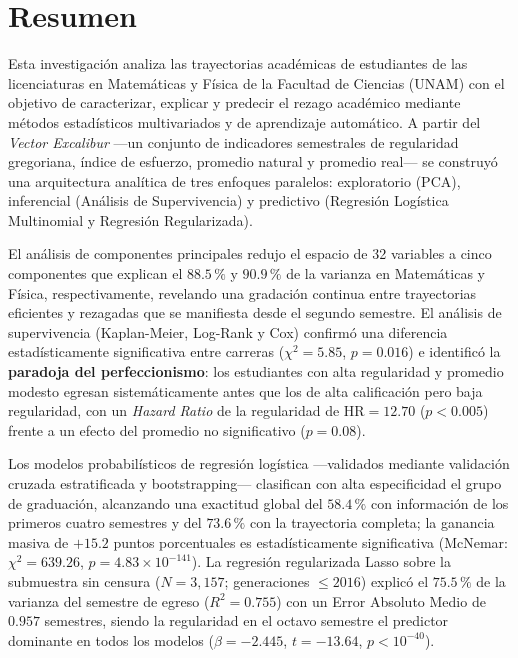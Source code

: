 \chapter*{Resumen}

Esta investigación analiza las trayectorias académicas de estudiantes de las licenciaturas en
Matemáticas y Física de la Facultad de Ciencias (UNAM) con el objetivo de caracterizar,
explicar y predecir el rezago académico mediante métodos estadísticos multivariados y de
aprendizaje automático. A partir del \emph{Vector Excalibur} —un conjunto de indicadores
semestrales de regularidad gregoriana, índice de esfuerzo, promedio natural y promedio
real— se construyó una arquitectura analítica de tres enfoques paralelos: exploratorio
(PCA), inferencial (Análisis de Supervivencia) y predictivo (Regresión Logística Multinomial y Regresión
Regularizada).

El análisis de componentes principales redujo el espacio de 32 variables a cinco componentes
que explican el $88.5\,\%$ y $90.9\,\%$ de la varianza en Matemáticas y Física,
respectivamente, revelando una gradación continua entre trayectorias eficientes y rezagadas
que se manifiesta desde el segundo semestre. El análisis de supervivencia (Kaplan-Meier,
Log-Rank y Cox) confirmó una diferencia estadísticamente significativa entre carreras
($\chi^2 = 5.85$, $p = 0.016$) e identificó la \textbf{paradoja del perfeccionismo}: los
estudiantes con alta regularidad y promedio modesto egresan sistemáticamente antes que los
de alta calificación pero baja regularidad, con un \emph{Hazard Ratio} de la regularidad de
$\text{HR} = 12.70$ ($p < 0.005$) frente a un efecto del promedio no significativo
($p = 0.08$).

Los modelos probabilísticos de regresión logística —validados mediante validación cruzada estratificada
y bootstrapping— clasifican con alta especificidad el grupo de graduación, alcanzando una exactitud global del
$58.4\,\%$ con información de los primeros cuatro semestres y del
$73.6\,\%$ con la trayectoria completa; la ganancia masiva de $+15.2$ puntos porcentuales
es estadísticamente significativa (McNemar: $\chi^2 = 639.26$,
$p = 4.83 \times 10^{-141}$). La regresión regularizada Lasso sobre la submuestra sin censura
($N = 3{,}157$; generaciones $\leq 2016$) explicó el $75.5\,\%$ de la varianza del semestre
de egreso ($R^2 = 0.755$) con un Error Absoluto Medio de $0.957$ semestres, siendo la
regularidad en el octavo semestre el predictor dominante en todos los modelos ($\beta = -2.445$,
$t = -13.64$, $p < 10^{-40}$).

